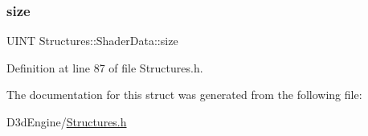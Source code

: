 \subsubsection{\texorpdfstring{size}{size}}
{\footnotesize\ttfamily U\+I\+NT Structures\+::\+Shader\+Data\+::size}



Definition at line 87 of file Structures.\+h.



The documentation for this struct was generated from the following file\+:\begin{DoxyCompactItemize}
\item 
D3d\+Engine/\mbox{\hyperlink{_structures_8h}{Structures.\+h}}\end{DoxyCompactItemize}
